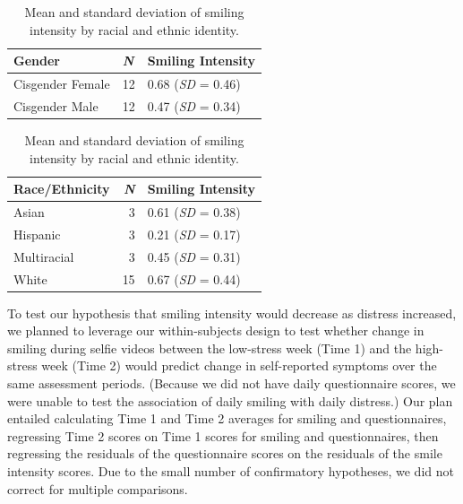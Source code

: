 \documentclass[authordate, empirical]{jote-new-article}
\begin{document}
\begin{table}[th!]
  \begin{fullwidth}

    \caption{Mean and standard deviation of smiling intensity by gender.}
    \begin{tabularx}{\linewidth}{@{} X l l @{}}
      \toprule
      \textbf{Gender}  & \textbf{\emph{N}} & \textbf{Smiling Intensity} \\
      \midrule

      Cisgender Female & 12                & 0.68 (\textit{SD} = 0.46)  \\

      Cisgender Male   & 12                & 0.47 (\textit{SD} = 0.34)  \\
      \bottomrule
    \end{tabularx}


    \vspace*{2\baselineskip}
    \caption{Mean and standard deviation of smiling intensity by racial and ethnic identity.}
    \begin{tabularx}{\linewidth}{@{} X r l @{}}
      \toprule
      \textbf{Race/Ethnicity} & \textbf{\textit{N}} & \textbf{Smiling Intensity} \\
      \midrule


      Asian                   & 3                   & 0.61 (\textit{SD} = 0.38)  \\

      Hispanic                & 3                   & 0.21 (\textit{SD} = 0.17)  \\

      Multiracial             & 3                   & 0.45 (\textit{SD} = 0.31)  \\

      White                   & 15                  & 0.67 (\textit{SD} = 0.44)  \\
      \bottomrule
    \end{tabularx}
  \end{fullwidth}
\end{table}


To test our hypothesis that smiling intensity would decrease as distress increased, we planned to leverage our within-subjects design to test whether change in smiling during selfie videos between the low-stress week (Time 1) and the high-stress week (Time 2) would predict change in self-reported symptoms over the same assessment periods. (Because we did not have daily questionnaire scores, we were unable to test the association of daily smiling with daily distress.) Our plan entailed calculating Time 1 and Time 2 averages for smiling and questionnaires, regressing Time 2 scores on Time 1 scores for smiling and questionnaires, then regressing the residuals of the questionnaire scores on the residuals of the smile intensity scores. Due to the small number of confirmatory hypotheses, we did not correct for multiple comparisons.
\end{document}
